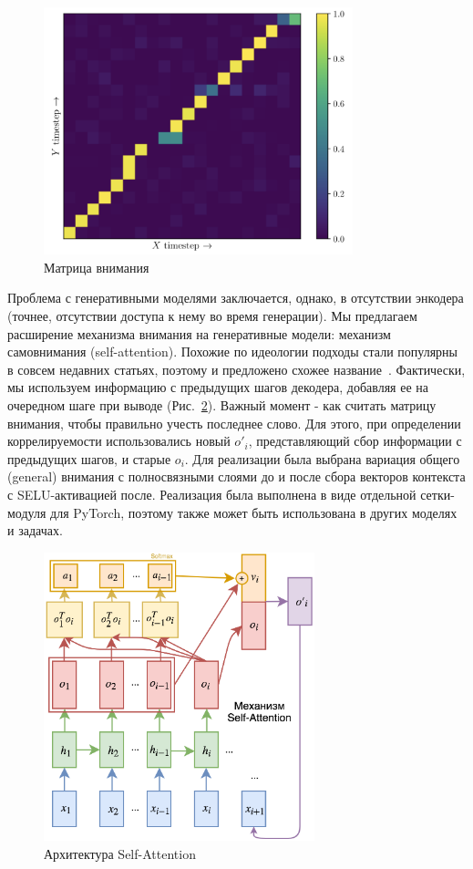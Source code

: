 \documentclass{spbau-diploma}
\begin{document}
\begin{figure}[H]
\centering
\includegraphics[width=0.8\textwidth]{images/attention.png}
\caption{Матрица внимания}
\label{attention}
\end{figure}

Проблема с генеративными моделями заключается, однако, в отсутствии энкодера 
(точнее, отсутствии доступа к нему во время генерации). Мы предлагаем 
расширение механизма внимания на генеративные модели: механизм 
самовнимания (self-attention). Похожие по идеологии подходы стали популярны в 
совсем недавних статьях, поэтому и предложено схожее 
название~\cite{1706.03762, 1805.08318}. Фактически, мы используем 
информацию с предыдущих шагов декодера, добавляя ее на очередном шаге при 
выводе (Рис.~\ref{self_attention}). Важный момент - как считать матрицу 
внимания, чтобы правильно учесть последнее слово. Для этого, при определении 
коррелируемости использовались новый $o'_i$, представляющий сбор информации с 
предыдущих шагов, и старые $o_i$. Для реализации 
была выбрана вариация общего (general) внимания с полносвязными слоями до и 
после сбора векторов контекста с SELU-активацией после. Реализация была 
выполнена в виде отдельной сетки-модуля для PyTorch, поэтому также может быть
использована в других моделях и задачах.

\begin{figure}[H]
\centering
\includegraphics[width=0.7\textwidth]{images/self_attention.png}
\caption{Архитектура Self-Attention}
\label{self_attention}
\end{figure}
\end{document}
